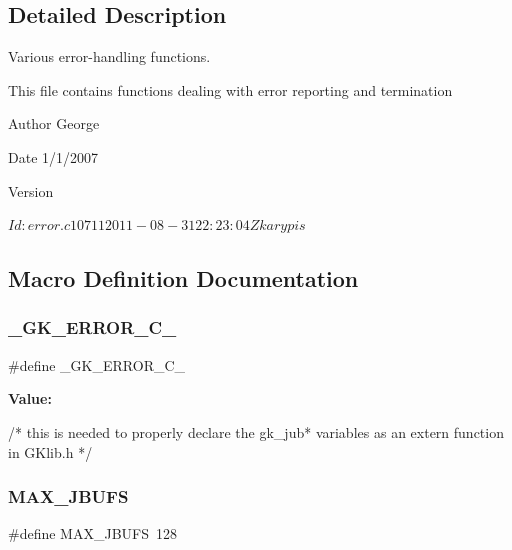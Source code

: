 \subsection{Detailed Description}
Various error-\/handling functions. 

This file contains functions dealing with error reporting and termination

\begin{DoxyAuthor}{Author}
George 
\end{DoxyAuthor}
\begin{DoxyDate}{Date}
1/1/2007 
\end{DoxyDate}
\begin{DoxyVersion}{Version}
\begin{DoxyVerb}$Id: error.c 10711 2011-08-31 22:23:04Z karypis $ \end{DoxyVerb}
 
\end{DoxyVersion}


\subsection{Macro Definition Documentation}
\mbox{\label{a00026_a8bb7cbc945cda2535b28210143678592}} 
\subsubsection{\texorpdfstring{\+\_\+\+G\+K\+\_\+\+E\+R\+R\+O\+R\+\_\+\+C\+\_\+}{\_GK\_ERROR\_C\_}}
{\footnotesize\ttfamily \#define \+\_\+\+G\+K\+\_\+\+E\+R\+R\+O\+R\+\_\+\+C\+\_\+}

{\bfseries Value\+:}
\begin{DoxyCode}
\textcolor{comment}{/* this is needed to properly declare the gk\_jub* variables}
\textcolor{comment}{                         as an extern function in GKlib.h */}
\end{DoxyCode}
\mbox{\label{a00026_aef49b1cc9e8eb8a2875e26ed0d87a4e6}} 
\subsubsection{\texorpdfstring{M\+A\+X\+\_\+\+J\+B\+U\+FS}{MAX\_JBUFS}}
{\footnotesize\ttfamily \#define M\+A\+X\+\_\+\+J\+B\+U\+FS~128}



